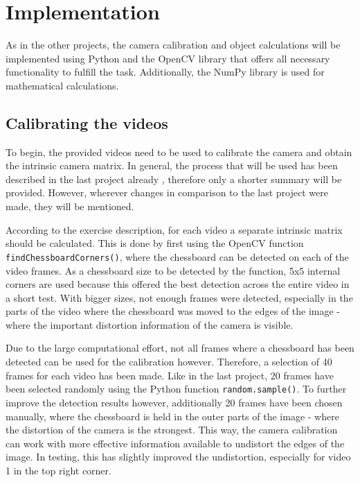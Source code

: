\chapter{Implementation}

As in the other projects, the camera calibration and object calculations will be implemented using Python and the OpenCV library that offers all necessary functionality to fulfill the task. \cite{pip_opencv} Additionally, the NumPy library is used for mathematical calculations. \cite{pip_numpy}

\section{Calibrating the videos}

To begin, the provided videos need to be used to calibrate the camera and obtain the intrinsic camera matrix. In general, the process that will be used has been described in the last project already \cite{report2}, therefore only a shorter summary will be provided. However, wherever changes in comparison to the last project were made, they will be mentioned.

According to the exercise description, for each video a separate intrinsic matrix should be calculated. \cite{cv_lecture_ex} This is done by first using the OpenCV function \texttt{findChessboardCorners()}, where the chessboard can be detected on each of the video frames. As a chessboard size to be detected by the function, 5x5 internal corners are used because this offered the best detection across the entire video in a short test. With bigger sizes, not enough frames were detected, especially in the parts of the video where the chessboard was moved to the edges of the image - where the important distortion information of the camera is visible.

Due to the large computational effort, not all frames where a chessboard has been detected can be used for the calibration however. Therefore, a selection of 40 frames for each video has been made. Like in the last project, 20 frames have been selected randomly using the Python function \texttt{random.sample()}. To further improve the detection results however, additionally 20 frames have been chosen manually, where the chessboard is held in the outer parts of the image - where the distortion of the camera is the strongest. This way, the camera calibration can work with more effective information available to undistort the edges of the image. In testing, this has slightly improved the undistortion, especially for video 1 in the top right corner.

